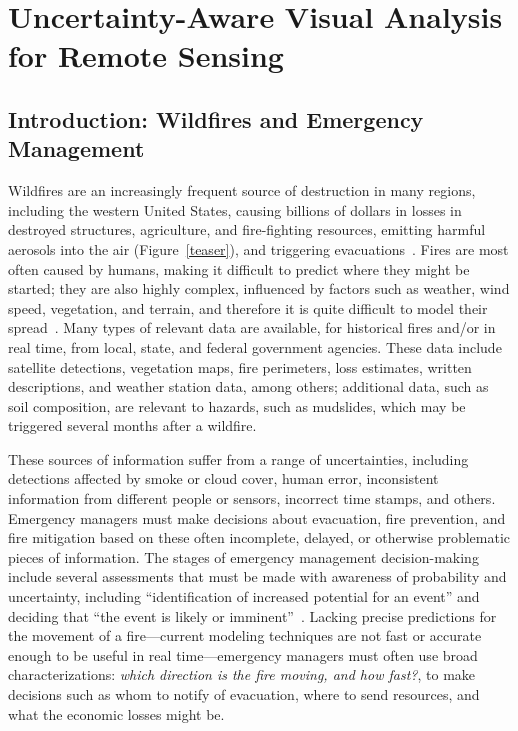 \chapter{Uncertainty-Aware Visual Analysis for Remote Sensing}
\section{Introduction: Wildfires and Emergency Management}
Wildfires are an increasingly frequent source of destruction in many regions, including the western United States, causing billions of dollars in losses in destroyed structures, agriculture, and fire-fighting resources, emitting harmful aerosols into the air (Figure~\ref{teaser}), and triggering evacuations~\cite{Smith2013}. Fires are most often caused by humans, making it difficult to predict where they might be started; they are also highly complex, influenced by factors such as weather, wind speed, vegetation, and terrain, and therefore it is quite difficult to model their spread~\cite{gollner2015towards}. Many types of relevant data are available, for historical fires and/or in real time, from local, state, and federal government agencies. These data include satellite detections, vegetation maps, fire perimeters, loss estimates, written descriptions, and weather station data, among others; additional data, such as soil composition, are relevant to hazards, such as mudslides, which may be triggered several months after a wildfire.

% 
% 
These sources of information suffer from a range of uncertainties, including detections affected by smoke or cloud cover, human error, inconsistent information from different people or sensors, incorrect time stamps, and others.
Emergency managers must make decisions about evacuation, fire prevention, and fire mitigation based on these often incomplete, delayed, or otherwise problematic pieces of information. The stages of emergency management decision-making include several assessments that must be made with awareness of probability and uncertainty, including ``identification of increased potential for an event'' and deciding that ``the event is likely or imminent''~\cite{Baumgart2006}. Lacking precise predictions for the movement of a fire---current modeling techniques are not fast or accurate enough to be useful in real time---emergency managers must often use broad characterizations: \textit{which direction is the fire moving, and how fast?}, to make decisions such as whom to notify of evacuation, where to send resources, and what the economic losses might be. 

